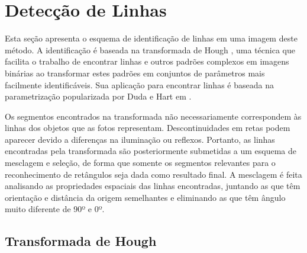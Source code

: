 \section{Detecção de Linhas} \label{met:linha}




Esta seção apresenta o esquema de identificação de linhas em uma imagem deste método. A identificação é baseada na transformada de Hough \cite{houghintro00}, uma técnica que facilita o trabalho de encontrar linhas e outros padrões complexos em imagens binárias ao transformar estes padrões em conjuntos de parâmetros mais facilmente identificáveis. Sua aplicação para encontrar linhas é baseada na parametrização popularizada por Duda e Hart em \cite{houghintro02}.

Os segmentos encontrados na transformada não necessariamente correspondem às linhas dos objetos que as fotos representam. Descontinuidades em retas podem aparecer devido a diferenças na iluminação ou reflexos. Portanto, as linhas encontradas pela transformada são posteriormente submetidas a um esquema de  mesclagem e seleção, de forma que somente os segmentos relevantes para o reconhecimento de retângulos seja dada como resultado final. A mesclagem é feita analisando as propriedades espaciais das linhas encontradas, juntando as que têm orientação e distância da origem semelhantes e eliminando as que têm ângulo muito diferente de 90º e 0º.

\subsection{Transformada de Hough}


